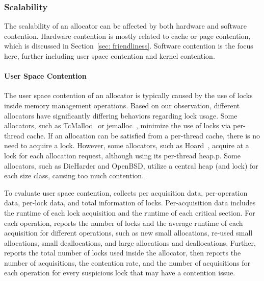 \subsubsection{Scalability} 
\label{sec:scalability}

The scalability of an allocator can be affected by both hardware and software contention. Hardware contention is mostly related to cache or page contention, which is discussed in Section~\ref{sec: friendliness}. Software contention is the focus here, further including user space contention and kernel contention. 

\paragraph{User Space Contention} The user space contention of an allocator is typically caused by the use of locks inside memory management operations. Based on our observation, different allocators have significantly differing behaviors regarding lock usage. Some allocators, such as TcMalloc~\cite{tcmalloc} or jemalloc~\cite{jemalloc}, minimize the use of locks via per-thread cache. If an allocation can be satisfied from a per-thread cache, there is no need to acquire a lock. However, some allocators, such as Hoard~\cite{Hoard}, acquire at a lock for each allocation request, although using its per-thread heap.p. Some allocators, such as DieHarder and OpenBSD, utilize a central heap (and lock) for each size class, causing too much contention. 


To evaluate user space contention, \MP{} collects per acquisition data, per-operation data, per-lock data, and total information of locks. Per-acquisition data includes the runtime of each lock acquisition and the runtime of each critical section. For each operation, \MP{} reports the number of locks and the average runtime of each acquisition for different operations, such as new small allocations, re-used small allocations, small deallocations, and large allocations and deallocations. Further, \MP{} reports the total number of locks used inside the allocator, then reports the number of acquisitions, the contention rate, and the number of acquisitions for each operation for every suspicious lock that may have a contention issue. 
 
